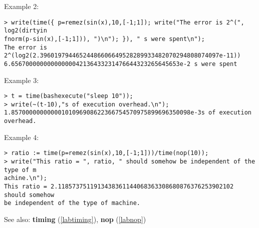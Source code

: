 \noindent Example 2: 
\begin{center}\begin{minipage}{15cm}\begin{Verbatim}[frame=single]
> write(time({ p=remez(sin(x),10,[-1;1]); write("The error is 2^(", log2(dirtyin
fnorm(p-sin(x),[-1;1])), ")\n"); }), " s were spent\n");
The error is 2^(log2(2.39601979446524486606649528289933482070294808074097e-11))
6.65670000000000000042136433231476644323265645653e-2 s were spent
\end{Verbatim}
\end{minipage}\end{center}
\noindent Example 3: 
\begin{center}\begin{minipage}{15cm}\begin{Verbatim}[frame=single]
> t = time(bashexecute("sleep 10"));
> write(~(t-10),"s of execution overhead.\n");
1.85700000000000101096908622366754570975899696350098e-3s of execution overhead.
\end{Verbatim}
\end{minipage}\end{center}
\noindent Example 4: 
\begin{center}\begin{minipage}{15cm}\begin{Verbatim}[frame=single]
> ratio := time(p=remez(sin(x),10,[-1;1]))/time(nop(10));
> write("This ratio = ", ratio, " should somehow be independent of the type of m
achine.\n");
This ratio = 2.1185737511913438361144068363308680876376253902102 should somehow 
be independent of the type of machine.
\end{Verbatim}
\end{minipage}\end{center}
See also: \textbf{timing} (\ref{labtiming}), \textbf{nop} (\ref{labnop})
